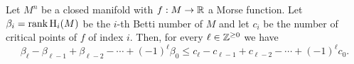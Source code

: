 
\begin{theorem}
	Let $M^n$ be a closed manifold with $f : M\to \mathbb{R}$ a Morse function. Let $\beta_i=\operatorname{rank} \operatorname{H}_i(M)$ be the $i$-th Betti number of $M$ and let $c_i$ be the number of critical points of $f$ of index $i$. Then, for every $\ell\in \mathbb{Z}^{\geq 0}$ we have
	\begin{equation}
		\beta_\ell - \beta_{\ell-1} + \beta_{\ell-2} - \cdots +(-1)^\ell \beta_0 \leq c_\ell - c_{\ell-1} + c_{\ell-2} - \cdots + (-1)^\ell c_0.
	\end{equation}
\end{theorem}
